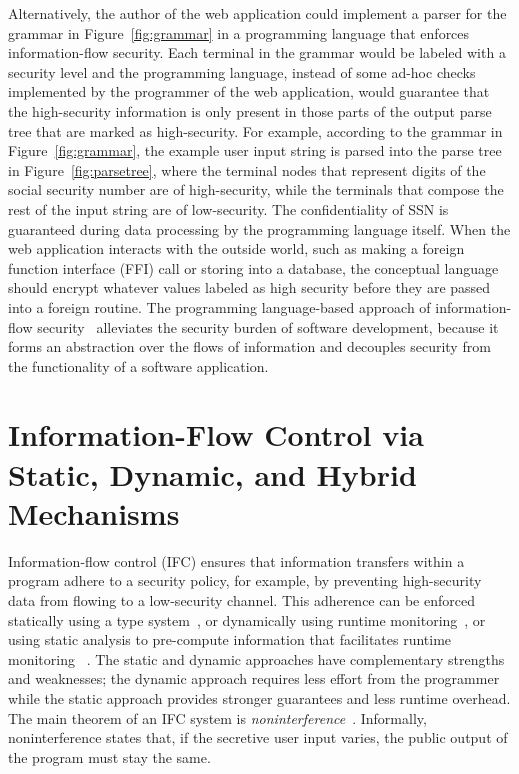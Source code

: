 Alternatively, the author of the web application could implement a parser for
the grammar in Figure~\ref{fig:grammar} in a programming language that enforces
information-flow security. Each terminal in the grammar would be labeled with a
security level and the programming language, instead of some ad-hoc checks
implemented by the programmer of the web application, would guarantee that the
high-security information is only present in those parts of the output parse
tree that are marked as high-security. For example, according to the grammar in
Figure~\ref{fig:grammar}, the example user input string is parsed into the parse
tree in Figure~\ref{fig:parsetree}, where the terminal nodes that represent
digits of the social security number are of {\color{red} high-security}, while
the terminals that compose the rest of the input string are of {\color{green}
  low-security}. The confidentiality of SSN is guaranteed during data processing
by the programming language itself. When the web application interacts with the
outside world, such as making a foreign function interface (FFI) call or storing
into a database, the conceptual language should encrypt whatever values labeled
as high security before they are passed into a foreign routine. The programming
language-based approach of information-flow
security~\parencite{sabelfeld2003language} alleviates the security burden of
software development, because it forms an abstraction over the flows of
information and decouples security from the functionality of a software
application.


\section{Information-Flow Control via Static, Dynamic, and Hybrid Mechanisms}


Information-flow control (IFC) ensures that information transfers within a
program adhere to a security policy, for example, by preventing high-security
data from flowing to a low-security channel. This adherence can be enforced
statically using a type
system~\parencite{volpano1996sound,Myers:1997aa,myers1999jflow}, or dynamically
using runtime
monitoring~\parencite{Askarov:2009vq,austin2009efficient,Devriese:2010up,stefan2011flexible,Austin:2017uh,Xiang:2021ub},
or using static analysis to pre-compute information that facilitates runtime
monitoring
~\parencite{le2005monitoring,le2007automaton,Chandra:2007we,Shroff:2007tg,russo2010dynamic,moore2011static}.
The static and dynamic approaches have complementary strengths and weaknesses;
the dynamic approach requires less effort from the programmer while the static
approach provides stronger guarantees and less runtime overhead. The main
theorem of an IFC system is \textit{noninterference}~\cite{goguen1982security}.
Informally, noninterference states that, if the secretive user input varies, the
public output of the program must stay the same.

